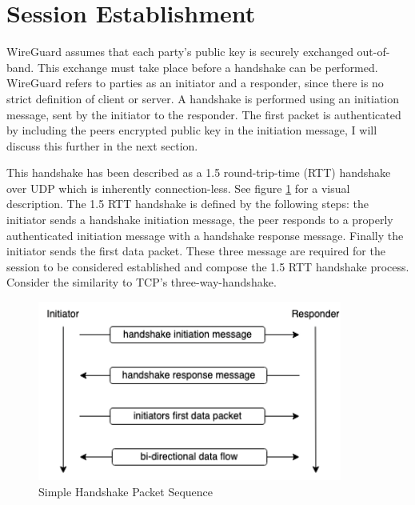 \documentclass [11pt, proquest] {uwthesis}[2020/02/24]
\begin{document}
\section {Session Establishment}
\label{session_establish}
WireGuard assumes that each party's public key is securely exchanged out-of-band. This exchange must take place before a handshake can be performed. 
WireGuard refers to parties as an initiator and a responder, since there is no strict definition of client or server. A handshake is performed using an initiation message, sent by the initiator to the responder. The first packet is authenticated by including the peers encrypted public key in the initiation message, I will discuss this further in the next section.

This handshake has been described as a 1.5 round-trip-time (RTT) handshake over UDP which is inherently connection-less. See figure \ref{fig:simpleHandSeq} for a visual description. The 1.5 RTT handshake is defined by the following steps: the initiator sends a handshake initiation message, the peer responds to a properly authenticated initiation message with a handshake response message. Finally the initiator sends the first data packet. These three message are required for the session to be considered established and compose the 1.5 RTT handshake process. Consider the similarity to TCP's three-way-handshake.

\begin{figure}[ht]
\begin{center}
\includegraphics[width=10cm]{paper/images/handshake_process.drawio}
\caption{Simple Handshake Packet Sequence}
\label{fig:simpleHandSeq}
\end{center}
\end{figure}
\end{document}
